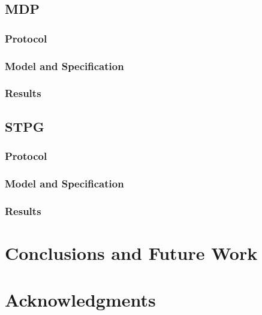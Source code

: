 \documentclass{llncs}
\begin{document}
\subsection{MDP}
\subsubsection{Protocol}
\subsubsection{Model and Specification}
\subsubsection{Results}

\subsection{STPG}
\subsubsection{Protocol}
\subsubsection{Model and Specification}
\subsubsection{Results}

\section{Conclusions and Future Work}

\section{Acknowledgments}
\end{document}
